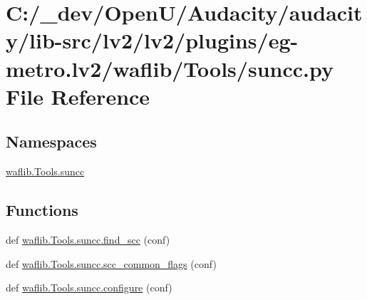 \hypertarget{lv2_2plugins_2eg-metro_8lv2_2waflib_2_tools_2suncc_8py}{}\section{C\+:/\+\_\+dev/\+Open\+U/\+Audacity/audacity/lib-\/src/lv2/lv2/plugins/eg-\/metro.lv2/waflib/\+Tools/suncc.py File Reference}
\label{lv2_2plugins_2eg-metro_8lv2_2waflib_2_tools_2suncc_8py}
\subsection*{Namespaces}
\begin{DoxyCompactItemize}
\item 
 \hyperlink{namespacewaflib_1_1_tools_1_1suncc}{waflib.\+Tools.\+suncc}
\end{DoxyCompactItemize}
\subsection*{Functions}
\begin{DoxyCompactItemize}
\item 
def \hyperlink{namespacewaflib_1_1_tools_1_1suncc_a810240f3b4d36933a366acad20a2d809}{waflib.\+Tools.\+suncc.\+find\+\_\+scc} (conf)
\item 
def \hyperlink{namespacewaflib_1_1_tools_1_1suncc_a783044dc96ae339c6feba5c8dbb9c95e}{waflib.\+Tools.\+suncc.\+scc\+\_\+common\+\_\+flags} (conf)
\item 
def \hyperlink{namespacewaflib_1_1_tools_1_1suncc_ae6f8e7665e3dfa76f606cbe655d4faf9}{waflib.\+Tools.\+suncc.\+configure} (conf)
\end{DoxyCompactItemize}
